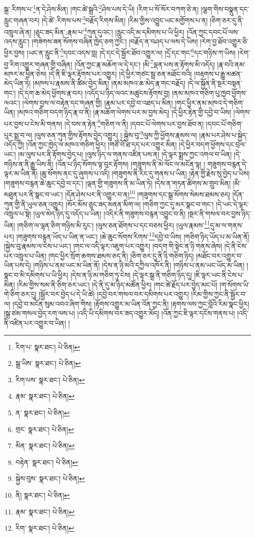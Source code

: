 སྒྲ་:རིགས་པ་\footnote{རིག་པ་  སྣར་ཐང་།  པེ་ཅིན། }ན་དེ་ཤེས་མིན། །གང་ཚེ་སྒྲའི་\footnote{སྒྲ་ཡིས་  སྣར་ཐང་།  པེ་ཅིན། }ཤེས་པས་དེ་ཡི། །རིག་པ་སོ་སོར་བཀག་ཅེ་ན། །ལྕག་གིས་བསྣུན་དང་རླུང་གཞན་བར། །དེ་ཚེ་:རིགས་པས་\footnote{རིག་པས་  སྣར་ཐང་།  པེ་ཅིན། }བརྗོད་རིགས་མིན། །རིམ་གྱིས་འབྱུང་ཡང་མགྱོགས་པ་ན། །ཅིག་ཅར་དུ་ནི་འཁྲུལ་ཞེ་ན། །ཅུང་ཟད་མིན་:རྣམ་པ་\footnote{རྣམ་  སྣར་ཐང་།  པེ་ཅིན། }ཀུན་དུའང་། །རླུང་འདི་མ་དམིགས་པ་ཡི་ཕྱིར། །འོན་ཀྱང་དབང་པོ་ལས་འདས་རླུང་། །གཟེགས་ཟན་སོགས་བཞིན་ཁྱེད་ཅག་ཀྱང་། །བརྗོད་ན་བཤད་པ་ལས་དེ་ཡིས། །རེག་བྱ་ཐོབ་འགྱུར་ཅི་ཕྱིར་བྱས། །ཡང་ན་རླུང་ནི་\footnote{ན་  སྣར་ཐང་།  པེ་ཅིན། }དབང་འདས་བླ། །དེ་དང་དེ་སྦྱོར་ཐོབ་འགྱུར་ལ། །དྲོ་དང་གང་\footnote{གྲང་  སྣར་ཐང་།  པེ་ཅིན། }དང་གཉིས་ཀ་ཡིས། །རེག་བྱ་རིག་འགྱུར་གཞན་གྱི་བཞིན། །འོན་ཀྱང་རྣ་མཆོག་ལ་དེ་དང་། །མི་\footnote{མིན་  སྣར་ཐང་།  པེ་ཅིན། }ལྡན་པས་ན་རྟོགས་མི་འདོད། །རྣ་བའི་ནམ་མཁར་མ་ཕྱིན་ཅེས། །དེ་ནི་ཇི་ལྟར་རྟོགས་པར་འགྱུར། །དེ་ཕྱིར་གཙང་སྦྲ་ཅན་མཐོང་བའི། །བརྟགས་པ་རྒྱུ་མཚན་མེད་ཡིན་ཏེ། །མཁས་པ་རྣམས་ནི་ཚིམ་བྱེད་མིན། །ནམ་མཁའ་ཆ་མེད་རྣ་གང་བརྗོད། །དེ་ལ་སྐྱོན་ནི་སྔར་བསྟན་གང་། །དེ་དག་ཆ་མེད་ཕྱོགས་རྣ་བར། །འདོད་པ་ཉིད་ལའང་མཚུངས་རྟོགས་བྱ། །ནམ་མཁའ་གཅིག་པུ་ཁྱབ་ཕྱོགས་ལའང་། །ལེགས་བྱས་ལ་བརྟེན་དང་གཞན་གྱི། །རྣམ་པར་དབྱེ་བ་འཐད་པ་མིན། །གང་ཕྱིར་ནམ་མཁའ་དེ་གཅིག་ཡིན། །མཁའ་གཅིག་བདག་ཉིད་རྣ་བ་ནི། །རྣ་མཆོག་ལེགས་པར་མ་བྱས་མེད། །དེ་ཕྱིར་རྟེན་གྱི་དབྱེ་བ་ཡིས། །ལེགས་པར་བྱས་པ་ངེས་མི་གནས། །དེ་བས་ན་རྟེན་\footnote{བརྟེན་  སྣར་ཐང་།  པེ་ཅིན། }གཅིག་ལ་ནི། །དབང་པོ་ལེགས་པར་བྱས་ཐོབ་ན། །དབང་པོ་གཅིག་པུར་སྨྲ་བ་ལ། །ལུས་ཅན་ཀུན་གྱིས་རྟོགས་བྱེད་འགྱུར། །:སྐྱེས་བུ་\footnote{སྐྱེས་བུས་  སྣར་ཐང་།  པེ་ཅིན། }ལུས་ཀྱི་ཕྱོགས་རྣམས་ལ། །རྣམ་པར་ཤེས་པ་སྐྱེད་འདོད་ཀྱི། །འོན་ཀྱང་ཁྱེད་ལ་མཁའ་གཅིག་ཕྱིར། །གཙོ་བོ་ཐ་དད་པར་འགྱུར་མིན། །དེ་ཕྱིར་བདག་ཕྱོགས་དང་བྲལ་ཡང་། །མ་ལུས་པར་ནི་རྟོགས་བྱེད་པ། །ལུས་ཉིད་ལ་གནས་འཛིན་པས་ན། །དེ་ལྟར་སྨྲས་ཀྱང་འགལ་བ་ཡིན། །དེ་གཉིས་ན་ནི་རྒྱུ་ཡིས་ནི། །འོན་པ་ཉིད་སོགས་ལྟ་བུར་རྟོགས། །གཟུགས་ནི་མེ་ལོང་ལ་མངོན་ལྟ། །
གཟུགས་བརྙན་དེ་ལྟར་མ་ཡིན་ནོ། །ཆུ་སོགས་ནང་དུ་ཞུགས་པ་འདི། །གཟུགས་ནི་རིང་དུ་གནས་པ་ཡིན། །རྟེན་གྱི་རྗེས་སུ་བྱེད་པ་ཡིས། །གཟུགས་བརྙན་ཆེ་ཆུང་དབྱེ་བ་དང་། །ལྡན་གྱི་གཟུགས་ནི་མ་ཡིན་ཏེ། །དེས་ན་གཏན་ཚིགས་མ་གྲུབ་མིན། །མི་མཐུན་པར་ནི་སྣང་བ་ཡང་། །དོན་ཤེས་པར་ནི་འགྱུར་བ་ན།\footnote{ནི།  སྣར་ཐང་།  པེ་ཅིན། } །གཟུགས་དང་སྒྲ་སོགས་སེམས་ཐམས་ཅད། །དོན་ཀུན་གྱི་ནི་ཡུལ་ཅན་འགྱུར། །སོར་མོས་ཅུང་ཟད་མནན་མིག་ལ། །གཅིག་ཀྱང་དུ་མར་སྣང་བ་གང་། །དེ་ཡང་དེ་ལྟར་འཁྲུལ་པ་སྟེ། །ཡུལ་མེད་ཉིད་དུ་འདོད་པ་ཡིན། །འདིར་ནི་གཟུགས་བརྙན་འབྱུང་བ་ནི། །སྔར་ནི་གསལ་བར་བྱས་ཉིད་ཡིན། །གཅིག་ལ་ལྷན་ཅིག་གཉིས་མི་རུང་། །ལུས་ཅན་ཐོགས་པ་དང་བཅས་ཕྱིར། །ཡུལ་རྣམས་\footnote{རྣམ་  སྣར་ཐང་།  པེ་ཅིན། }དུ་མ་ལ་གནས་པར། །གཟུགས་བརྙན་ཡོད་པ་ཡིན་ན་ཡང་། །ཆེ་ཆུང་སོགས་རིགས་\footnote{རིག་  སྣར་ཐང་།  པེ་ཅིན། }དབྱེ་བ་ཡིས། །གཅིག་ཉིད་ཡོད་པ་མ་ཡིན་ནོ། །སྐྱེས་བུ་རྣམས་ལ་ངེས་པ་ཡང་། །གང་ལ་འདི་ལྟར་འཇུག་པར་འགྱུར། །བདག་གི་སྟེང་ན་ཉི་གནས་ཞེས། །དེ་ནི་ངེས་པར་འཁྲུལ་པ་ཡིན། །གང་ཕྱིར་སྲོག་ཆགས་ཐམས་ཅད་ནི། །ཅིག་ཅར་དུ་ནི་ཉི་གཅིག་ཉིད། །མཐོང་བར་འགྱུར་བ་ཡིན་པས་དེ། །གཉིས་པ་ནམ་ཡང་མ་ཡིན་ནོ། །དེས་ན་ཉི་མའི་དཀྱིལ་འཁོར་ནི། །གཉིས་པ་ནམ་ཡང་ཡོད་མ་ཡིན། །སྣང་བ་མི་དམིགས་པ་ཡི་ཕྱིར། །དེས་ན་ཉི་མ་གཅིག་ཏུ་ངེས། །དེ་ལྟར་སྒྲ་ནི་གཅིག་ཉིད་དུ། །ཇི་ལྟར་ཡང་ནི་ངེས་པ་མིན། །རིམ་གྱིས་སམ་ནི་ཅིག་ཅར་ཡང་། །དེ་ནི་དུ་མ་ཉིད་མཚོན་ཕྱིར། །གང་ཚེ་རྗོད་པར་བྱེད་མང་པོ། །ག་སོགས་ཡི་གེ་ཅིག་ཅར་དུ། །སྦྱོར་བར་བྱེད་པ་དེ་ཡི་ཚེ། །དབྱེ་བར་གསལ་བར་དམིགས་པར་འགྱུར། །རིམ་གྱིས་ཀྱང་ནི་སྦྱོར་བ་ལ། །དབྱེ་བ་མངོན་སུམ་འབའ་ཞིག་གིས། །རྟོགས་འགྱུར་མ་ཡིན་འོན་ཀྱང་ནི། །རྟགས་ལས་ཀྱང་བློའི་རིམ་སྣང་ཕྱིར། །སྒྲ་ཙམ་གསལ་བྱེད་རག་ལས་པ། །འདི་ཡི་དམིགས་བར་ཟད་འགྱུར་མོད། །འོན་ཀྱང་ཇི་ལྟར་དངོས་གནས་པ། །འདི་ནི་འཛིན་པར་འགྱུར་བ་ཡིན། །
